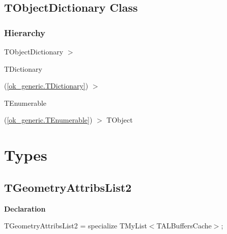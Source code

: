 \documentclass{report}
\newif\ifpdf
\begin{document}
\subsection*{TObjectDictionary Class}
\fi
\label{ok_generic.TObjectDictionary}
\subsubsection*{\large{\textbf{Hierarchy}}\normalsize\hspace{1ex}\hfill}
TObjectDictionary {$>$} \begin{ttfamily}TDictionary\end{ttfamily}(\ref{ok_generic.TDictionary}) {$>$} \begin{ttfamily}TEnumerable\end{ttfamily}(\ref{ok_generic.TEnumerable}) {$>$} 
TObject
\section{Types}
\ifpdf
\subsection*{\large{\textbf{TGeometryAttribsList2}}\normalsize\hspace{1ex}\hrulefill}
\else
\subsection*{TGeometryAttribsList2}
\fi
\label{ok_generic-TGeometryAttribsList2}
\begin{list}{}{
\setlength{\itemindent}{0cm}
\setlength{\listparindent}{0cm}
\setlength{\leftmargin}{\evensidemargin}
\addtolength{\leftmargin}{\tmplength}
\settowidth{\labelsep}{X}
\addtolength{\leftmargin}{\labelsep}
\setlength{\labelwidth}{\tmplength}
}
\item[\textbf{Declaration}\hfill]
\ifpdf
\begin{flushleft}
\fi
\begin{ttfamily}
TGeometryAttribsList2 = specialize TMyList{$<$}TALBuffersCache{$>$};\end{ttfamily}

\ifpdf
\end{flushleft}
\fi

\end{list}
\end{document}
